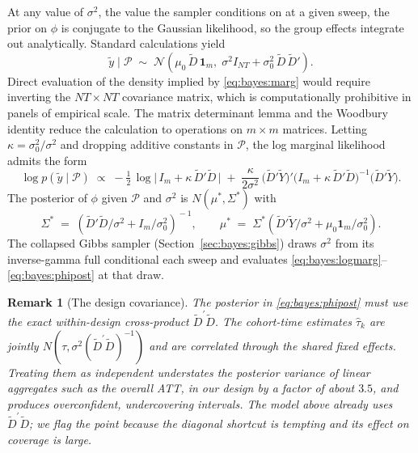 \documentclass[margin=5in, 12pt]{article}
\newtheorem{remark}{Remark}
\newcommand{\1}{\mathbbm{1}}
\begin{document}
  At any value of $\sigma^{2}$, the value the sampler conditions on at a given sweep, the prior on $\phi$ is conjugate to the Gaussian likelihood, so the group effects integrate out analytically.
  Standard calculations yield
  \begin{equation}
    \tilde{y} \mid \mathcal{P} \;\sim\; \mathcal{N}\!\left(\mu_{0}\,\tilde{D}\,\mathbf{1}_{m},\; \sigma^{2} I_{NT} +
  \sigma_{0}^{2}\,\tilde{D}\,\tilde{D}'\right).
    \label{eq:bayes:marg}
  \end{equation}
  Direct evaluation of the density implied by \eqref{eq:bayes:marg} would require inverting the $NT \times NT$ covariance matrix,
   which is computationally prohibitive in panels of empirical scale. The matrix determinant lemma and the Woodbury identity
  reduce the calculation to operations on $m \times m$ matrices. Letting $\kappa = \sigma_{0}^{2}/\sigma^{2}$ and dropping
  additive constants in $\mathcal{P}$, the log marginal likelihood admits the form
  \begin{equation}
    \log p(\tilde{y} \mid \mathcal{P}) \;\propto\; -\tfrac{1}{2}\,\log\bigl|\,I_{m} + \kappa\,\tilde{D}'\tilde{D}\,\bigr| \;+\;
  \frac{\kappa}{2\sigma^{2}}\, \bigl(\tilde{D}'\tilde{Y}\bigr)'\!\bigl(I_{m} +
  \kappa\,\tilde{D}'\tilde{D}\bigr)^{-1}\!\bigl(\tilde{D}'\tilde{Y}\bigr).
    \label{eq:bayes:logmarg}
  \end{equation}
  The posterior of $\phi$ given $\mathcal{P}$ and $\sigma^{2}$ is $N(\mu^{\ast},\Sigma^{\ast})$ with
  \begin{equation}
    \Sigma^{\ast} \;=\; \left(\tilde{D}'\tilde{D}/\sigma^{2} + I_{m}/\sigma_{0}^{2}\right)^{\!-1}, \qquad
  \mu^{\ast} \;=\; \Sigma^{\ast}\!\left(\tilde{D}'\tilde{Y}/\sigma^{2} +
  \mu_{0}\mathbf{1}_{m}/\sigma_{0}^{2}\right).
    \label{eq:bayes:phipost}
  \end{equation}
  The collapsed Gibbs sampler (Section~\ref{sec:bayes:gibbs}) draws $\sigma^{2}$ from its inverse-gamma full conditional each sweep and evaluates \eqref{eq:bayes:logmarg}--\eqref{eq:bayes:phipost} at that draw.

  \begin{remark}[The design covariance]
  \label{rem:sigma}
  The posterior in \eqref{eq:bayes:phipost} must use the exact within-design
  cross-product $\tilde D^{\prime}\tilde D$. The cohort-time estimates
  $\hat\tau_{k}$ are jointly $N(\tau, \sigma^2(\tilde D^{\prime}\tilde D)^{-1})$
  and are correlated through the shared fixed effects. Treating them as
  independent understates the posterior variance of linear aggregates such as the
  overall ATT, in our design by a factor of about $3.5$, and produces
  overconfident, undercovering intervals. The model above already uses
  $\tilde D^{\prime}\tilde D$; we flag the point because the diagonal shortcut is
  tempting and its effect on coverage is large.
  \end{remark}
\end{document}
